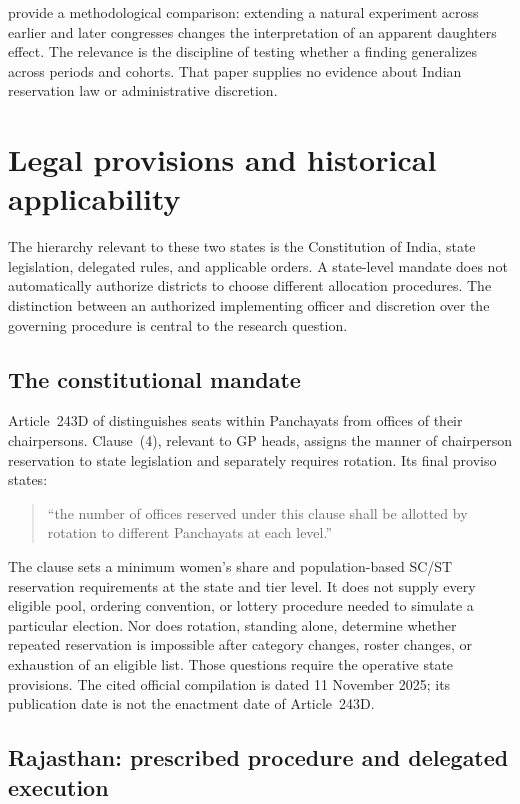 \citet{green2023} provide a methodological comparison: extending a natural
experiment across earlier and later congresses changes the interpretation of
an apparent daughters effect. The relevance is the discipline of testing
whether a finding generalizes across periods and cohorts. That paper supplies
no evidence about Indian reservation law or administrative discretion.

\section{Legal provisions and historical applicability}
\label{app:law}

The hierarchy relevant to these two states is the Constitution of India, state
legislation, delegated rules, and applicable orders. A state-level mandate does
not automatically authorize districts to choose different allocation procedures.
The distinction between an authorized implementing officer and discretion over
the governing procedure is central to the research question.

\subsection{The constitutional mandate}

Article~243D of \citet{constitution} distinguishes seats within Panchayats
from offices of their chairpersons. Clause~(4), relevant to GP heads, assigns
the manner of chairperson reservation to state legislation and separately
requires rotation. Its final proviso states:
\begin{quote}
``the number of offices reserved under this clause shall be allotted by
rotation to different Panchayats at each level.''
\end{quote}
The clause sets a minimum women's share and population-based SC/ST reservation
requirements at the state and tier level. It does not supply every eligible
pool, ordering convention, or lottery procedure needed to simulate a particular
election. Nor does rotation, standing alone, determine whether repeated
reservation is impossible after category changes, roster changes, or exhaustion
of an eligible list. Those questions require the operative state provisions.
The cited official compilation is dated 11 November 2025; its publication date
is not the enactment date of Article~243D.

\subsection{Rajasthan: prescribed procedure and delegated execution}

